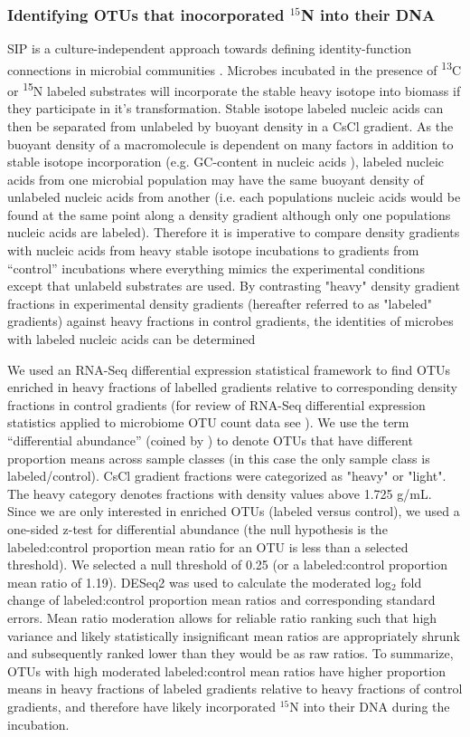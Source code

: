 \subsubsection{Identifying OTUs that inocorporated $^{15}$N into their DNA}
SIP is a culture-independent approach towards defining identity-function
connections in microbial communities \citep{Buckley_2011, 17446886}. Microbes
incubated in the presence of \textsuperscript{13}C or \textsuperscript{15}N
labeled substrates will incorporate the stable heavy isotope into biomass if
they participate in it's transformation.  Stable isotope labeled nucleic acids
can then be separated from unlabeled by buoyant density in a CsCl gradient. As
the buoyant density of a macromolecule is dependent on many factors in addition
to stable isotope incorporation (e.g.  GC-content in nucleic acids
\citep{25139123}), labeled nucleic acids from one microbial population may have
the same buoyant density of unlabeled nucleic acids from another (i.e.  each
populations nucleic acids would be found at the same point along a density
gradient although only one populations nucleic acids are labeled). Therefore it
is imperative to compare density gradients with nucleic
acids from heavy stable isotope incubations to gradients from ``control''
incubations where everything mimics the experimental conditions except that
unlabeld substrates
are used. By contrasting "heavy" density gradient fractions in experimental
density gradients (hereafter referred to as "labeled" gradients) against heavy
fractions in control gradients, the identities of microbes with labeled nucleic
acids can be determined 

We used an RNA-Seq differential expression statistical framework
\citep{Love_2014} to find OTUs enriched in heavy fractions of labelled gradients
relative to corresponding density fractions in control gradients (for review of
RNA-Seq differential expression statistics applied to microbiome OTU count data
see \citet{24699258}). We use the term “differential abundance” (coined
by \citet{24699258}) to denote OTUs that have different proportion means
across sample classes (in this case the only sample class is labeled/control).
CsCl gradient fractions were categorized as "heavy" or "light". The heavy
category denotes fractions with density values above 1.725 g/mL. Since we are
only interested in enriched OTUs (labeled versus control), we used a one-sided
z-test for differential abundance (the null hypothesis is the
labeled:control proportion mean ratio for an OTU is less than a selected
threshold). We selected a null threshold of 0.25 (or a labeled:control
proportion mean ratio of 1.19). DESeq2 was used to calculate the moderated
log$_{2}$ fold change of labeled:control proportion mean ratios and
corresponding standard errors. Mean ratio moderation allows for reliable ratio
ranking such that high variance and likely statistically insignificant mean
ratios are appropriately shrunk and subsequently ranked lower than they would
be as raw ratios. To summarize, OTUs with high moderated labeled:control mean
ratios have higher proportion means in heavy fractions of labeled gradients
relative to
heavy fractions of control gradients, and therefore have likely incorporated
$^{15}$N into their DNA during the incubation.

